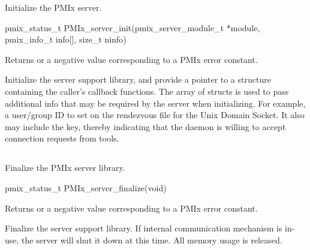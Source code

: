 \summary

Initialize the \ac{PMIx} server.

\format

\cspecificstart
\begin{codepar}
pmix_status_t
PMIx_server_init(pmix_server_module_t *module,
                 pmix_info_t info[], size_t ninfo)
\end{codepar}
\cspecificend

\begin{arglist}
\end{arglist}

Returns  or a negative value corresponding to a PMIx error constant.

\descr

Initialize the server support library, and provide a pointer to a  structure containing the caller's callback functions.
The array of  structs is used to pass additional info that may be required by the server when initializing.
For example, a user/group ID to set on the rendezvous file for the Unix Domain Socket.
It also may include the  key, thereby indicating that the daemon is willing to accept connection requests from tools.


\subsection{}

\summary

Finalize the PMIx server library.

\format

\cspecificstart
\begin{codepar}
pmix_status_t
PMIx_server_finalize(void)
\end{codepar}
\cspecificend

Returns  or a negative value corresponding to a PMIx error constant.

\descr

Finalize the server support library.
If internal communication mechanism is in-use, the server will shut it down at this time.
All memory usage is released.

